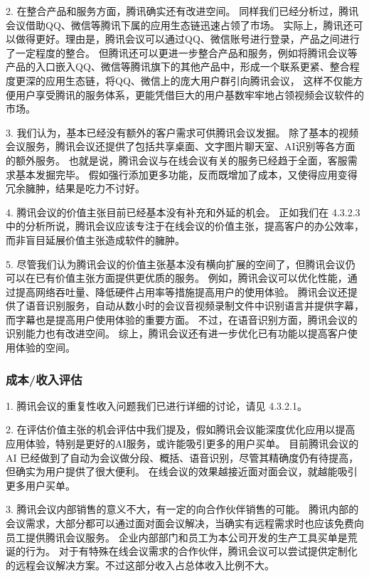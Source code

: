 \documentclass[a4paper,12pt]{article}
\begin{document}
    2.
    在整合产品和服务方面，腾讯确实还有改进空间。
    同样我们已经分析过，腾讯会议借助QQ、微信等腾讯下属的应用生态链迅速占领了市场。
    实际上，腾讯还可以做得更好。理由是，腾讯会议可以通过QQ、微信账号进行登录，产品之间进行了一定程度的整合。
    但腾讯还可以更进一步整合产品和服务，例如将腾讯会议等产品的入口嵌入QQ、微信等腾讯旗下的其他产品中，形成一个联系更紧、整合程度更深的应用生态链，将QQ、微信上的庞大用户群引向腾讯会议，
    这样不仅能方便用户享受腾讯的服务体系，更能凭借巨大的用户基数牢牢地占领视频会议软件的市场。


    3.
    我们认为，基本已经没有额外的客户需求可供腾讯会议发掘。
    除了基本的视频会议服务，腾讯会议还提供了包括共享桌面、文字图片聊天室、AI识别等各方面的额外服务。
    也就是说，腾讯会议与在线会议有关的服务已经趋于全面，客服需求基本发掘完毕。
    假如强行添加更多功能，反而既增加了成本，又使得应用变得冗余臃肿，结果是吃力不讨好。


    4.
    腾讯会议的价值主张目前已经基本没有补充和外延的机会。
    正如我们在 4.3.2.3 中的分析所说，腾讯会议应该专注于在线会议的价值主张，提高客户的办公效率，而非盲目延展价值主张造成软件的臃肿。


    5.
    尽管我们认为腾讯会议的价值主张基本没有横向扩展的空间了，但腾讯会议仍可以在已有价值主张方面提供更优质的服务。
    例如，腾讯会议可以优化性能，通过提高网络吞吐量、降低硬件占用率等措施提高用户的使用体验。
    腾讯会议还提供了语音识别服务，自动从数小时的会议音视频录制文件中识别语言并提供字幕，而字幕也是提高用户使用体验的重要方面。
    不过，在语音识别方面，腾讯会议的识别能力也有改进空间。
    综上，腾讯会议还有进一步优化已有功能以提高客户使用体验的空间。


    \subsubsection{成本/收入评估}


    1.
    腾讯会议的重复性收入问题我们已进行详细的讨论，请见 4.3.2.1。


    2.
    在评估价值主张的机会评估中我们提及，假如腾讯会议能深度优化应用以提高应用体验，特别是更好的AI服务，或许能吸引更多的用户买单。
    目前腾讯会议的 AI 已经做到了自动为会议做分段、概括、语音识别，尽管其精确度仍有待提高，但确实为用户提供了很大便利。
    在线会议的效果越接近面对面会议，就越能吸引更多用户买单。


    3.
    腾讯会议内部销售的意义不大，有一定的向合作伙伴销售的可能。
    腾讯内部的会议需求，大部分都可以通过面对面会议解决，当确实有远程需求时也应该免费向员工提供腾讯会议服务。
    企业内部部门和员工为本公司开发的生产工具买单是荒诞的行为。
    对于有特殊在线会议需求的合作伙伴，腾讯会议可以尝试提供定制化的远程会议解决方案。不过这部分收入占总体收入比例不大。
\end{document}
